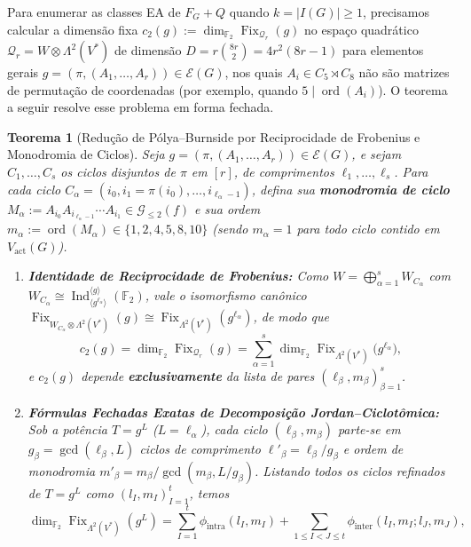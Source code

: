 \documentclass[11pt,a4paper]{article}
\newtheorem{theorem}{Teorema}[section]
\theoremstyle{definition}
\theoremstyle{remark}
\newcommand{\F}{\mathbb{F}_2}
\newcommand{\Fix}{\operatorname{Fix}}
\newcommand{\Ind}{\operatorname{Ind}}
\begin{document}
Para enumerar as classes EA de $F_G + Q$ quando $k = |I(G)| \ge 1$, precisamos calcular a dimensão fixa $c_2(g) := \dim_{\F}\Fix_{\mathcal{Q}_r}(g)$ no espaço quadrático $\mathcal{Q}_r = W \otimes \Lambda^2(V^*)$ de dimensão $D = r\binom{8r}{2} = 4r^2(8r-1)$ para elementos gerais $g = (\pi, (A_1,\dots,A_r)) \in \mathcal{E}(G)$, nos quais $A_i \in C_5 \rtimes C_8$ não são matrizes de permutação de coordenadas (por exemplo, quando $5 \mid \operatorname{ord}(A_i)$). O teorema a seguir resolve esse problema em forma fechada.

\begin{theorem}[Redução de Pólya--Burnside por Reciprocidade de Frobenius e Monodromia de Ciclos]\label{thm:c1_burnside}
Seja $g = (\pi, (A_1,\dots,A_r)) \in \mathcal{E}(G)$, e sejam $C_1,\dots,C_s$ os ciclos disjuntos de $\pi$ em $[r]$, de comprimentos $\ell_1,\dots,\ell_s$. Para cada ciclo $C_\alpha = (i_0, i_1=\pi(i_0), \dots, i_{\ell_\alpha-1})$, defina sua \textbf{monodromia de ciclo} $M_\alpha := A_{i_0} A_{i_{\ell_\alpha-1}} \cdots A_{i_1} \in \mathcal{G}_{\le 2}(f)$ e sua ordem $m_\alpha := \operatorname{ord}(M_\alpha) \in \{1, 2, 4, 5, 8, 10\}$ (sendo $m_\alpha = 1$ para todo ciclo contido em $V_{\mathrm{act}}(G)$).
\begin{enumerate}
  \item \textbf{Identidade de Reciprocidade de Frobenius:} Como $W = \bigoplus_{\alpha=1}^s W_{C_\alpha}$ com $W_{C_\alpha} \cong \Ind_{\langle g^{\ell_\alpha}\rangle}^{\langle g\rangle}(\F)$, vale o isomorfismo canônico $\Fix_{W_{C_\alpha} \otimes \Lambda^2(V^*)}(g) \cong \Fix_{\Lambda^2(V^*)}(g^{\ell_\alpha})$, de modo que
  \begin{equation}\label{eq:frob_c2}
    c_2(g) = \dim_{\F}\Fix_{\mathcal{Q}_r}(g) = \sum_{\alpha=1}^s \dim_{\F}\Fix_{\Lambda^2(V^*)}\!\big(g^{\ell_\alpha}\big),
  \end{equation}
  e $c_2(g)$ depende \textbf{exclusivamente} da lista de pares $(\ell_\beta, m_\beta)_{\beta=1}^s$.
  \item \textbf{Fórmulas Fechadas Exatas de Decomposição Jordan--Ciclotômica:} Sob a potência $T = g^L$ ($L = \ell_\alpha$), cada ciclo $(\ell_\beta, m_\beta)$ parte-se em $g_\beta = \gcd(\ell_\beta, L)$ ciclos de comprimento $\ell'_\beta = \ell_\beta / g_\beta$ e ordem de monodromia $m'_\beta = m_\beta / \gcd(m_\beta, L / g_\beta)$. Listando todos os ciclos refinados de $T = g^L$ como $(l_I, m_I)_{I=1}^t$, temos
  \begin{equation}\label{eq:lambda2_decomp}
    \dim_{\F}\Fix_{\Lambda^2(V^*)}(g^L) = \sum_{I=1}^t \phi_{\mathrm{intra}}(l_I, m_I) + \sum_{1 \le I < J \le t} \phi_{\mathrm{inter}}(l_I, m_I; l_J, m_J),

\end{equation}
\end{enumerate}
\end{theorem}
\end{document}
